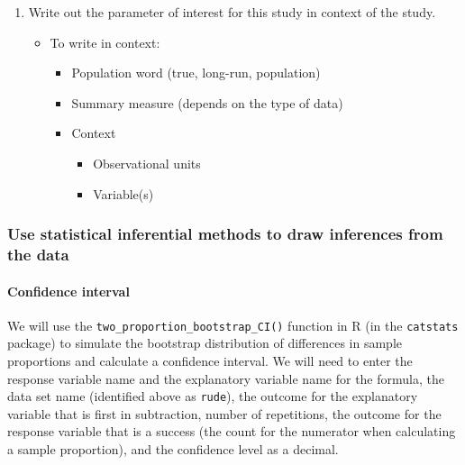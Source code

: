 \documentclass[
]{report}
\begin{document}
\begin{enumerate}
\def\labelenumi{\arabic{enumi}.}
\setcounter{enumi}{4}
\item
  Write out the parameter of interest for this study in context of the study.

  \begin{itemize}
  \item
    To write in context:

    \begin{itemize}
    \item
      Population word (true, long-run, population)
    \item
      Summary measure (depends on the type of data)
    \item
      Context

      \begin{itemize}
      \item
        Observational units
      \item
        Variable(s)
        \vspace{1in}
      \end{itemize}
    \end{itemize}
  \end{itemize}
\end{enumerate}

\subsubsection*{Use statistical inferential methods to draw inferences from the data}\label{use-statistical-inferential-methods-to-draw-inferences-from-the-data-3}

\paragraph*{Confidence interval}\label{confidence-interval-4}

We will use the \texttt{two\_proportion\_bootstrap\_CI()} function in R (in the \texttt{catstats} package) to simulate the bootstrap distribution of differences in sample proportions and calculate a confidence interval. We will need to enter the response variable name and the explanatory variable name for the formula, the data set name (identified above as \texttt{rude}), the outcome for the explanatory variable that is first in subtraction, number of repetitions, the outcome for the response variable that is a success (the count for the numerator when calculating a sample proportion), and the confidence level as a decimal.
\end{document}
